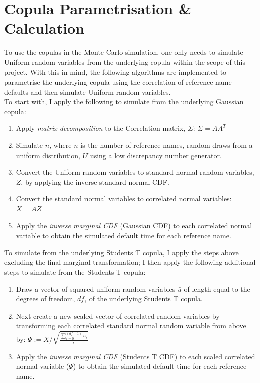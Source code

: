 \documentclass{report}
\theoremstyle{plain}
\theoremstyle{definition}
\begin{document}
\section{Copula Parametrisation \& Calculation}

To use the copulas in the Monte Carlo simulation, one only needs to simulate Uniform random variables from the underlying copula within the scope of this project. With this in mind, the following algorithms are implemented to parametrise the underlying copula using the correlation of reference name defaults and then simulate Uniform random variables.\\

To start with, I apply the following to simulate from the underlying Gaussian copula:
\begin{enumerate}
	\item Apply \emph{matrix decomposition} to the Correlation matrix, $\Sigma$: $\Sigma = A A^{T}$
	\item Simulate $n$, where $n$ is the number of reference names, random draws from a uniform distribution, $U$ using a low discrepancy number generator.
	\item Convert the Uniform random variables to standard normal random variables, $Z$, by applying the inverse standard normal CDF.
	\item Convert the standard normal variables to correlated normal variables: $X = AZ$
	\item Apply the \emph{inverse marginal CDF} (Gaussian CDF) to each correlated normal variable to obtain the simulated default time for each reference name.
\end{enumerate}

To simulate from the underlying Students T copula, I apply the steps above excluding the final marginal transformation; I then apply the following additional steps to simulate from the Students T copula:
\begin{enumerate}
	\item Draw a vector of squared uniform random variables $\bar{u}$ of length equal to the degrees of freedom, $df$, of the underlying Students T copula.
	\item Next create a new scaled vector of correlated random variables by transforming each correlated standard normal random variable from above by: $\Psi := X / \sqrt{\frac{\sum_{i=0}^{(df-1)}\bar{u}_i}{\epsilon}}$
	\item Apply the \emph{inverse marginal CDF} (Students T CDF) to each scaled correlated normal variable ($\Psi$) to obtain the simulated default time for each reference name.
\end{enumerate}
\end{document}
